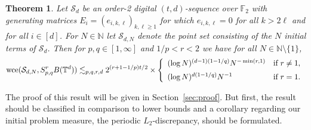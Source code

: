 \documentclass[12pt, a4paper]{article}
\newtheorem{thm}{Theorem}
\def\S{\mathcal{S}}
\newcommand{\wce}{{\rm wce}}
\newcommand{\N}{{\mathbb{N}}} %
\newcommand{\bbT}{{\mathbb{T}}}
\newcommand{\bbN}{{\mathbb{N}}}
\begin{document}
\begin{thm}\label{thm1}
Let $\S_d$ be an order-2 digital $(t,d)$-sequence over $\mathbb{F}_2$ with generating matrices $E_i=(e_{i,k,\ell})_{k,\ell \ge 1}$ for which $e_{i,k,\ell}=0$ for all $k > 2 \ell$ and for all $i \in [d]$. For $N \in \N$ let $\S_{d,N}$ denote the point set consisting of the $N$ initial terms of $\S_d$. Then for $p,q \in [1,\infty]$ and $1/p < r <2$ we have for all $N \in \bbN\setminus\{1\}$, 
\begin{equation*}
\wce(\S_{d,N}, S^r_{p, q}B(\bbT^d)) \lesssim_{p,q,r,d} 2^{(r+1-1/p)t/2} \times \left\{ 
\begin{array}{ll}
(\log N)^{(d-1)(1-1/q)}N^{-\min(r,1)} & \mbox{if } r \not= 1,\\[0.5em]
(\log N)^{d(1-1/q)}N^{-1} & \mbox{if } r = 1.%
\end{array}\right. 
\end{equation*}
\end{thm}

The proof of this result will be given in Section~\ref{sec:proof}. But first, the result should be classified in comparison to lower bounds and a corollary regarding our initial problem measure, the periodic $L_2$-discrepancy, should be formulated.
\end{document}
